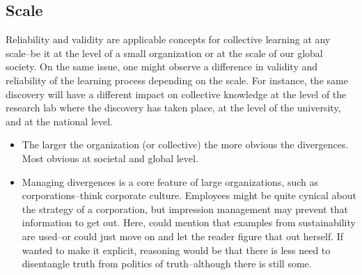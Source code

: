 
\subsection*{Scale}

Reliability and validity are applicable concepts for collective learning at any scale--be it at the level of a small organization or at the scale of our global society. On the same issue, one might observe a difference in validity and reliability of the learning process depending on the scale. For instance, the same discovery will have a different impact on collective knowledge at the level of the research lab where the discovery has taken place, at the level of the university, and at the national level.

\begin{itemize}
	\item The larger the organization (or collective) the more obvious the divergences. Most obvious at societal and global level.
	\item Managing divergences is a core feature of large organizations, such as corporations--think corporate culture. Employees might be quite cynical about the strategy of a corporation, but impression management may prevent that information to get out.
		\subitem Here, could mention that examples from sustainability are used--or could just move on and let the reader figure that out herself. 
		\subitem If wanted to make it explicit, reasoning would be that there is less need to disentangle truth from politics of truth--although there is still some.
\end{itemize}